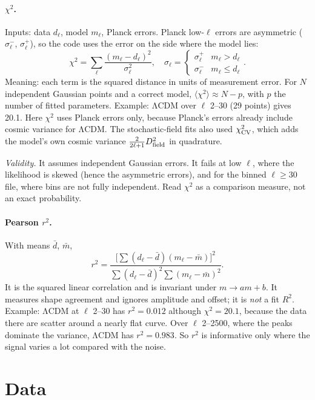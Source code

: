 \documentclass[10pt,twocolumn]{article}
\newcommand{\why}[1]{\par\noindent\textit{Validity.} #1\par}
\begin{document}
\paragraph{$\chi^2$.} Inputs: data $d_\ell$, model $m_\ell$, Planck errors. Planck low-$\ell$ errors are asymmetric ($\sigma^-_\ell$, $\sigma^+_\ell$), so the code uses the error on the side where the model lies:
\begin{equation}\label{eq9}
\chi^2=\sum_\ell\frac{(m_\ell-d_\ell)^2}{\sigma_\ell^2},\quad\sigma_\ell=\begin{cases}\sigma^+_\ell&m_\ell>d_\ell\\\sigma^-_\ell&m_\ell\le d_\ell\end{cases}.
\end{equation}
Meaning: each term is the squared distance in units of measurement error. For $N$ independent Gaussian points and a correct model, $\langle\chi^2\rangle\approx N-p$, with $p$ the number of fitted parameters. Example: ΛCDM over $\ell$ 2--30 (29 points) gives 20.1. Here $\chi^2$ uses Planck errors only, because Planck's errors already include cosmic variance for ΛCDM. The stochastic-field fits also used $\chi^2_{\rm CV}$, which adds the model's own cosmic variance $\tfrac{2}{2\ell+1}D_{\rm field}^2$ in quadrature.
\why{It assumes independent Gaussian errors. It fails at low $\ell$, where the likelihood is skewed (hence the asymmetric errors), and for the binned $\ell\ge30$ file, where bins are not fully independent. Read $\chi^2$ as a comparison measure, not an exact probability.}
\paragraph{Pearson $r^2$.} With means $\bar d$, $\bar m$,
\begin{equation}\label{eq10}
r^2=\frac{\big[\sum(d_\ell-\bar d)(m_\ell-\bar m)\big]^2}{\sum(d_\ell-\bar d)^2\sum(m_\ell-\bar m)^2}.
\end{equation}
It is the squared linear correlation and is invariant under $m\to am+b$. It measures shape agreement and ignores amplitude and offset; it is \emph{not} a fit $R^2$. Example: ΛCDM at $\ell$ 2--30 has $r^2=0.012$ although $\chi^2=20.1$, because the data there are scatter around a nearly flat curve. Over $\ell$ 2--2500, where the peaks dominate the variance, ΛCDM has $r^2=0.983$. So $r^2$ is informative only where the signal varies a lot compared with the noise.

\section{Data}\label{sec:data}
\end{document}
